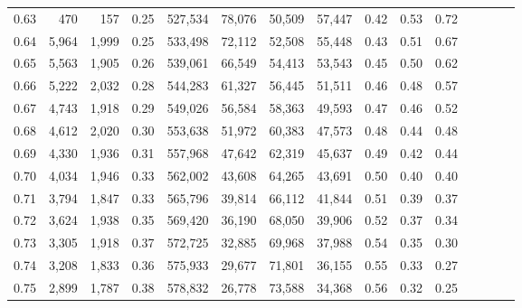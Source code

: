 \begin{tabular}{rrrcrrrrrrrrrrr}
0.63 &     470 &    157 &                                       0.25 &  527,534 &   78,076 &   50,509 &   57,447 &  0.42 &  0.53 &                         0.72 \\
0.64 &   5,964 &  1,999 &                                       0.25 &  533,498 &   72,112 &   52,508 &   55,448 &  0.43 &  0.51 &                         0.67 \\
0.65 &   5,563 &  1,905 &                                       0.26 &  539,061 &   66,549 &   54,413 &   53,543 &  0.45 &  0.50 &                         0.62 \\
0.66 &   5,222 &  2,032 &                                       0.28 &  544,283 &   61,327 &   56,445 &   51,511 &  0.46 &  0.48 &                         0.57 \\
0.67 &   4,743 &  1,918 &                                       0.29 &  549,026 &   56,584 &   58,363 &   49,593 &  0.47 &  0.46 &                         0.52 \\
0.68 &   4,612 &  2,020 &                                       0.30 &  553,638 &   51,972 &   60,383 &   47,573 &  0.48 &  0.44 &                         0.48 \\
0.69 &   4,330 &  1,936 &                                       0.31 &  557,968 &   47,642 &   62,319 &   45,637 &  0.49 &  0.42 &                         0.44 \\
0.70 &   4,034 &  1,946 &                                       0.33 &  562,002 &   43,608 &   64,265 &   43,691 &  0.50 &  0.40 &                         0.40 \\
0.71 &   3,794 &  1,847 &                                       0.33 &  565,796 &   39,814 &   66,112 &   41,844 &  0.51 &  0.39 &                         0.37 \\
0.72 &   3,624 &  1,938 &                                       0.35 &  569,420 &   36,190 &   68,050 &   39,906 &  0.52 &  0.37 &                         0.34 \\
0.73 &   3,305 &  1,918 &                                       0.37 &  572,725 &   32,885 &   69,968 &   37,988 &  0.54 &  0.35 &                         0.30 \\
0.74 &   3,208 &  1,833 &                                       0.36 &  575,933 &   29,677 &   71,801 &   36,155 &  0.55 &  0.33 &                         0.27 \\
0.75 &   2,899 &  1,787 &                                       0.38 &  578,832 &   26,778 &   73,588 &   34,368 &  0.56 &  0.32 &                         0.25 \\

\end{tabular}
